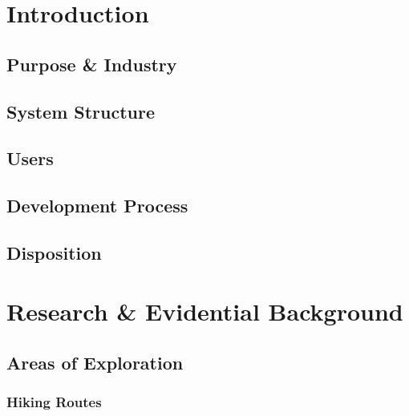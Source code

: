 \documentclass[11pt, english]{article}
\begin{document}
\newpage

	\renewcommand{\contentsname}{Table of Contents}

	\tableofcontents

\newpage

	\listoftables

\newpage

	\listoffigures

\newpage


\section{Introduction}\label{ch1}

	\subsection{Purpose \& Industry}

	\subsection{System Structure}

	\subsection{Users}

	\subsection{Development Process}

	\subsection{Disposition}

\newpage

\section{Research \& Evidential Background}\label{ch2}

	\subsection{Areas of Exploration}

		\subsubsection{Hiking Routes}
\end{document}
